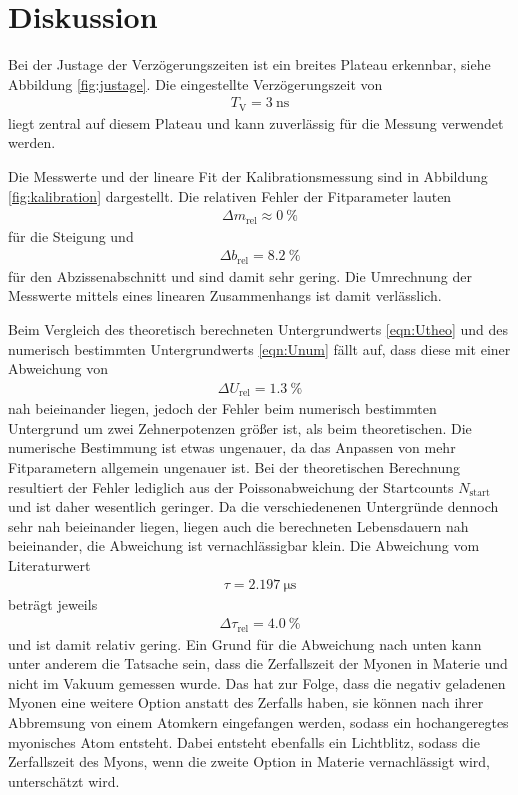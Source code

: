 \section{Diskussion}
\label{sec:Diskussion}

Bei der Justage der Verzögerungszeiten ist ein breites Plateau erkennbar, siehe Abbildung \ref{fig:justage}.
Die eingestellte Verzögerungszeit von
\begin{align*}
   T_\text{V} = \SI{3}{\nano\second}
\end{align*}
liegt zentral auf diesem Plateau und kann zuverlässig für die Messung verwendet werden.

Die Messwerte und der lineare Fit der Kalibrationsmessung sind in Abbildung \ref{fig:kalibration} dargestellt.
Die relativen Fehler der Fitparameter lauten
\begin{align}
  \Delta m_\text{rel} \approx \SI{0}{\percent}
\end{align}
für die Steigung und
\begin{align}
  \Delta b_\text{rel} = \SI{8.2}{\percent}
\end{align}
für den Abzissenabschnitt und sind damit sehr gering. Die Umrechnung der Messwerte mittels eines linearen Zusammenhangs ist
damit verlässlich.

Beim Vergleich des theoretisch berechneten Untergrundwerts \eqref{eqn:Utheo} und des numerisch bestimmten
Untergrundwerts \eqref{eqn:Unum} fällt auf, dass diese mit einer Abweichung von
\begin{align}
  \Delta U_\text{rel} = \SI{1.3}{\percent}
\end{align}
nah beieinander liegen, jedoch der Fehler beim numerisch bestimmten Untergrund um zwei Zehnerpotenzen größer ist,
als beim theoretischen. Die numerische Bestimmung ist etwas ungenauer, da das Anpassen von mehr Fitparametern
allgemein ungenauer ist. Bei der theoretischen Berechnung resultiert der Fehler lediglich aus der Poissonabweichung der
Startcounts $N_\text{start}$ und ist daher wesentlich geringer.
Da die verschiedenenen Untergründe dennoch sehr nah beieinander liegen, liegen auch die berechneten Lebensdauern nah beieinander,
die Abweichung ist vernachlässigbar klein. Die Abweichung vom Literaturwert \cite{pdg}
\begin{align}
  \tau = \SI{2.197}{\micro\second}
\end{align}
beträgt jeweils
\begin{align}
  \Delta \tau_\text{rel} = \SI{4.0}{\percent}
\end{align}
und ist damit relativ gering. Ein Grund für die Abweichung nach unten kann unter anderem die Tatsache sein, dass die
Zerfallszeit der Myonen in Materie und nicht im Vakuum gemessen wurde. Das hat zur Folge, dass die negativ geladenen
Myonen eine weitere Option anstatt des Zerfalls haben, sie können nach ihrer Abbremsung von einem Atomkern eingefangen
werden, sodass ein hochangeregtes myonisches Atom entsteht. Dabei entsteht ebenfalls ein Lichtblitz, sodass die Zerfallszeit
des Myons, wenn die zweite Option in Materie vernachlässigt wird, unterschätzt wird.
